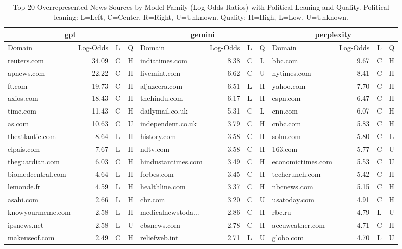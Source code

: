 \begin{table*}[htbp]
\centering
\caption{Top 20 Overrepresented News Sources by Model Family (Log-Odds Ratios) with Political Leaning and Quality. Political leaning: L=Left, C=Center, R=Right, U=Unknown. Quality: H=High, L=Low, U=Unknown.}
\label{tab:overrepresented_news_sources}
\begin{tabular}{lrcc|lrcc|lrcc}
\toprule
\multicolumn{4}{c|}{\textbf{gpt}} & \multicolumn{4}{c|}{\textbf{gemini}} & \multicolumn{4}{c}{\textbf{perplexity}} \\
\midrule
Domain & Log-Odds & L & Q & Domain & Log-Odds & L & Q & Domain & Log-Odds & L & Q \\
\midrule
reuters.com & 34.09 & C & H & indiatimes.com & 8.38 & C & L & bbc.com & 9.67 & C & H \\
apnews.com & 22.22 & C & H & livemint.com & 6.62 & C & U & nytimes.com & 8.41 & C & H \\
ft.com & 19.73 & C & H & aljazeera.com & 6.51 & L & H & yahoo.com & 7.70 & C & H \\
axios.com & 18.43 & C & H & thehindu.com & 6.17 & L & H & espn.com & 6.47 & C & H \\
time.com & 11.43 & C & H & dailymail.co.uk & 5.31 & C & L & cnn.com & 6.07 & C & H \\
as.com & 10.63 & C & U & independent.co.uk & 3.79 & C & H & cnbc.com & 5.83 & C & H \\
theatlantic.com & 8.64 & L & H & history.com & 3.58 & C & H & sohu.com & 5.80 & C & L \\
elpais.com & 7.67 & L & H & ndtv.com & 3.58 & C & H & 163.com & 5.77 & C & U \\
theguardian.com & 6.03 & C & H & hindustantimes.com & 3.49 & C & H & economictimes.com & 5.53 & C & U \\
biomedcentral.com & 4.64 & L & H & forbes.com & 3.45 & C & H & techcrunch.com & 5.42 & C & H \\
lemonde.fr & 4.59 & L & H & healthline.com & 3.37 & C & H & nbcnews.com & 5.15 & C & H \\
asahi.com & 2.66 & L & H & cbr.com & 3.20 & C & U & usatoday.com & 4.91 & C & H \\
knowyourmeme.com & 2.58 & L & H & medicalnewstoda... & 2.86 & C & H & rbc.ru & 4.79 & L & U \\
ipsnews.net & 2.58 & L & U & cbsnews.com & 2.78 & C & H & accuweather.com & 4.71 & C & H \\
makeuseof.com & 2.49 & C & H & reliefweb.int & 2.71 & L & U & globo.com & 4.70 & L & U \\

\end{tabular}
\end{table*}
